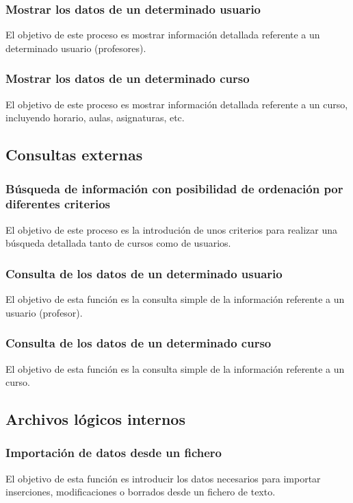 \documentclass[11pt,a4paper,spanish,twoside]{book}
\begin{document}
\subsubsection{Mostrar los datos de un determinado usuario}
El objetivo de este proceso es mostrar información detallada referente a un
determinado usuario (profesores).

\subsubsection{Mostrar los datos de un determinado curso}
El objetivo de este proceso es mostrar información detallada referente a un
curso, incluyendo horario, aulas, asignaturas, etc.

\subsection{Consultas externas}
\subsubsection{Búsqueda de información con posibilidad de ordenación por
  diferentes criterios}
El objetivo de este proceso es la introdución de unos criterios para realizar 
una búsqueda detallada tanto de cursos como de usuarios.

\subsubsection{Consulta de los datos de un determinado usuario}
El objetivo de esta función es la consulta simple de la información referente
a un usuario (profesor).

\subsubsection{Consulta de los datos de un determinado curso}
El objetivo de esta función es la consulta simple de la información referente
a un curso.

\subsection{Archivos lógicos internos}
\subsubsection{Importación de datos desde un fichero}
El objetivo de esta función es introducir los datos necesarios para importar 
inserciones, modificaciones o borrados desde un fichero de texto.
\end{document}

